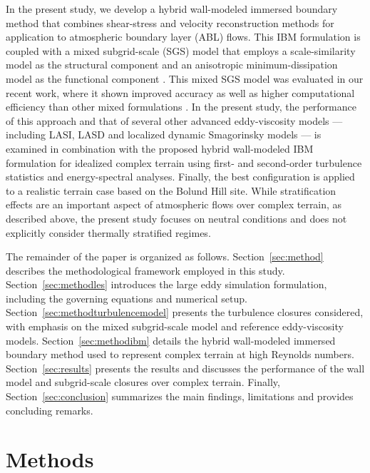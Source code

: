 \documentclass[%
superscriptaddress,
 amsmath,amssymb,
pra,
showkeys,
]{revtex4-2}
\begin{document}
In the present study, we develop a hybrid wall-modeled immersed boundary method that combines shear-stress and velocity reconstruction methods for application to atmospheric boundary layer (ABL) flows. This IBM formulation is coupled with a mixed subgrid-scale (SGS) model that employs a scale-similarity model \cite{bardina1983improved} as the structural component and an anisotropic minimum-dissipation model as the functional component \cite{rozema2015minimum,verstappen2018much}. This mixed SGS model was evaluated in our recent work, where it shown improved accuracy as well as higher computational efficiency than other mixed formulations \cite{ajay2025mixed}. In the present study, the performance of this approach and that of several other advanced eddy-viscosity models --- including LASI, LASD and localized dynamic Smagorinsky models --- is examined in combination with the proposed hybrid wall-modeled IBM formulation for idealized complex terrain using first- and second-order turbulence statistics and energy-spectral analyses. Finally, the best configuration is applied to a realistic terrain case based on the Bolund Hill site. While stratification effects are an important aspect of atmospheric flows over complex terrain, as described above, the present study focuses on neutral conditions and does not explicitly consider thermally stratified regimes.

The remainder of the paper is organized as follows. Section~\ref{sec:method} describes the methodological framework employed in this study. Section~\ref{sec:methodles} introduces the large eddy simulation formulation, including the governing equations and numerical setup. Section~\ref{sec:methodturbulencemodel} presents the turbulence closures considered, with emphasis on the mixed subgrid-scale model and reference eddy-viscosity models. Section~\ref{sec:methodibm} details the hybrid wall-modeled immersed boundary method used to represent complex terrain at high Reynolds numbers. Section~\ref{sec:results} presents the results and discusses the performance of the wall model and subgrid-scale closures over complex terrain. Finally, Section~\ref{sec:conclusion} summarizes the main findings, limitations and provides concluding remarks.

\section{\label{sec:method} Methods}
\end{document}
